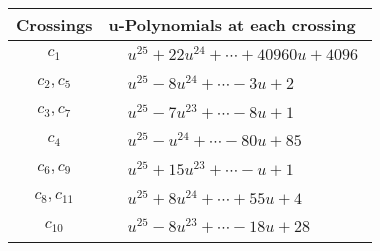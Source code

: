 \documentclass[1p]{elsarticle_modified}
\theoremstyle{definition}
\begin{document}
\begin{tabular}{m{50pt}|m{274pt}}
Crossings & \hspace{64pt}u-Polynomials at each crossing \\
\hline $$\begin{aligned}c_{1}\end{aligned}$$&$\begin{aligned}
&u^{25}+22 u^{24}+\cdots+40960 u+4096
\end{aligned}$\\
\hline $$\begin{aligned}c_{2},c_{5}\end{aligned}$$&$\begin{aligned}
&u^{25}-8 u^{24}+\cdots-3 u+2
\end{aligned}$\\
\hline $$\begin{aligned}c_{3},c_{7}\end{aligned}$$&$\begin{aligned}
&u^{25}-7 u^{23}+\cdots-8 u+1
\end{aligned}$\\
\hline $$\begin{aligned}c_{4}\end{aligned}$$&$\begin{aligned}
&u^{25}- u^{24}+\cdots-80 u+85
\end{aligned}$\\
\hline $$\begin{aligned}c_{6},c_{9}\end{aligned}$$&$\begin{aligned}
&u^{25}+15 u^{23}+\cdots- u+1
\end{aligned}$\\
\hline $$\begin{aligned}c_{8},c_{11}\end{aligned}$$&$\begin{aligned}
&u^{25}+8 u^{24}+\cdots+55 u+4
\end{aligned}$\\
\hline $$\begin{aligned}c_{10}\end{aligned}$$&$\begin{aligned}
&u^{25}-8 u^{23}+\cdots-18 u+28
\end{aligned}$\\
\hline
\end{tabular}\\~\\
\newpage\renewcommand{\arraystretch}{1}
\end{document}
